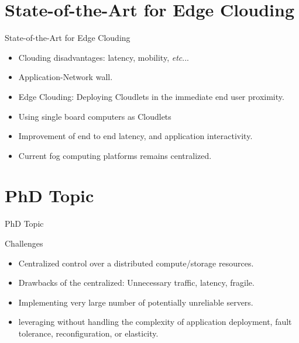 \documentclass{beamer}
\begin{document}
\section{State-of-the-Art for Edge Clouding}

\begin{frame}{State-of-the-Art for Edge Clouding}

\begin{block}{}
    \begin{itemize}
    \item Clouding disadvantages: latency, mobility, {\em etc}...
    \item<2->  Application-Network wall.
     \item<3-> Edge Clouding: Deploying Cloudlets in the immediate end user proximity.
      \item<4-> Using single board computers as Cloudlets
      \item<5-> Improvement of end to end latency, and application interactivity. 
      \item<6-> Current fog computing platforms remains centralized.
    \end{itemize}
    \end{block}

\end{frame}

\section{PhD Topic}
\begin{frame}{PhD Topic}
 \begin{block}{Challenges}
    \begin{itemize}
    \item Centralized control over a distributed compute/storage resources.
    \item<2-> Drawbacks of the centralized: Unnecessary traffic, latency, fragile.
    \item<3-> Implementing very large number of potentially unreliable servers.
    \item<4-> leveraging without handling the complexity of application deployment, fault tolerance, reconfiguration, or elasticity.
      
    \end{itemize}
    
    \end{block}
\end{frame}
\end{document}
